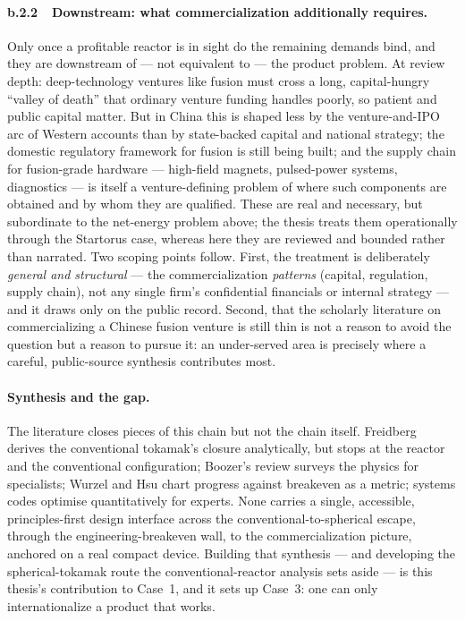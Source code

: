 \documentclass[11pt]{article}
\begin{document}
\paragraph{b.2.2~~Downstream: what commercialization additionally requires.}
Only once a profitable reactor is in sight do the remaining demands bind, and they are downstream of --- not equivalent to --- the product problem. At review depth: deep-technology ventures like fusion must cross a long, capital-hungry ``valley of death'' that ordinary venture funding handles poorly, so patient and public capital matter.\cite{fia2025} But in China this is shaped less by the venture-and-IPO arc of Western accounts than by state-backed capital and national strategy; the domestic regulatory framework for fusion is still being built; and the supply chain for fusion-grade hardware --- high-field magnets, pulsed-power systems, diagnostics --- is itself a venture-defining problem of where such components are obtained and by whom they are qualified.\cite{xinhua2025,tan_interview_cn,chenrui_interview_cn} These are real and necessary, but subordinate to the net-energy problem above; the thesis treats them operationally through the Startorus case, whereas here they are reviewed and bounded rather than narrated. Two scoping points follow. First, the treatment is deliberately \emph{general and structural} --- the commercialization \emph{patterns} (capital, regulation, supply chain), not any single firm's confidential financials or internal strategy --- and it draws only on the public record. Second, that the scholarly literature on commercializing a Chinese fusion venture is still thin is not a reason to avoid the question but a reason to pursue it: an under-served area is precisely where a careful, public-source synthesis contributes most.

\paragraph{Synthesis and the gap.}
The literature closes pieces of this chain but not the chain itself. Freidberg derives the conventional tokamak's closure analytically, but stops at the reactor and the conventional configuration;\cite{freidberg2015} Boozer's review surveys the physics for specialists;\cite{boozer2005} Wurzel and Hsu chart progress against breakeven as a metric;\cite{wurzel_hsu2022} systems codes optimise quantitatively for experts.\cite{process2020} None carries a single, accessible, principles-first design interface across the conventional-to-spherical escape, through the engineering-breakeven wall, to the commercialization picture, anchored on a real compact device. Building that synthesis --- and developing the spherical-tokamak route the conventional-reactor analysis sets aside --- is this thesis's contribution to Case~1, and it sets up Case~3: one can only internationalize a product that works.
\end{document}
